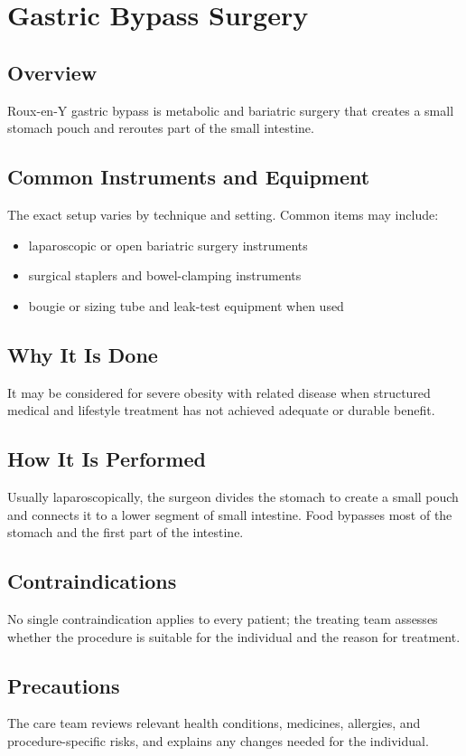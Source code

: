 \chapter{Gastric Bypass Surgery}

\section*{Overview}
Roux-en-Y gastric bypass is metabolic and bariatric surgery that creates a small stomach pouch and reroutes part of the small intestine.

\section*{Common Instruments and Equipment}
The exact setup varies by technique and setting. Common items may include:
\begin{itemize}[nosep,leftmargin=*]
  \item laparoscopic or open bariatric surgery instruments
  \item surgical staplers and bowel-clamping instruments
  \item bougie or sizing tube and leak-test equipment when used
\end{itemize}

\section*{Why It Is Done}
It may be considered for severe obesity with related disease when structured medical and lifestyle treatment has not achieved adequate or durable benefit.

\section*{How It Is Performed}
Usually laparoscopically, the surgeon divides the stomach to create a small pouch and connects it to a lower segment of small intestine. Food bypasses most of the stomach and the first part of the intestine.

\section*{Contraindications}
No single contraindication applies to every patient; the treating team assesses whether the procedure is suitable for the individual and the reason for treatment.

\section*{Precautions}
The care team reviews relevant health conditions, medicines, allergies, and procedure-specific risks, and explains any changes needed for the individual.


